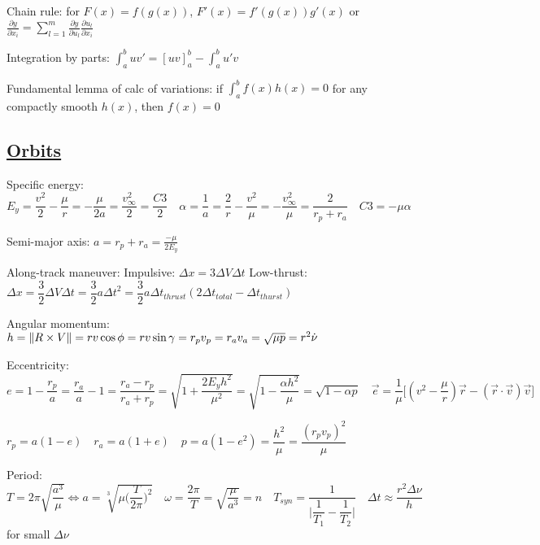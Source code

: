 \documentclass[11pt,landscape]{article}
\begin{document}
Chain rule: for $F(x)=f(g(x))$, $F'(x)=f'(g(x))g'(x)$
or $\frac{\partial y}{\partial x_i} = 
\sum_{l=1}^{m} \frac{\partial y}{\partial u_l}\frac{\partial u_l}{\partial x_i}$

Integration by parts: $\int_{a}^{b} u v' = [uv]_{a}^{b} - \int_{a}^{b} u'v$

Fundamental lemma of calc of variations:
if $\int_{a}^{b}f(x)h(x) = 0$ for any compactly smooth $h(x)$, then $f(x)=0$




\newpage
\subsection{\underline{Orbits}}

\begin{wrapfigure}{r}{0.25\textwidth}
\end{wrapfigure}

Specific energy:
$
E_y 
= \dfrac{v^2}{2} - \dfrac{\mu}{r} 
= -\dfrac{\mu}{2a} 
= \dfrac{v_{\infty}^2}{2} 
= \dfrac{C3}{2}
\quad
\alpha
= \dfrac{1}{a}
= \dfrac{2}{r} - \dfrac{v^2}{\mu}
= -\dfrac{v_{\infty}^2}{\mu}
= \dfrac{2}{r_p+r_a}
\quad
C3 = -\mu\alpha
$

Semi-major axis:
$
a
= r_p + r_a
= \frac{-\mu}{2 E_y}
$


Along-track maneuver:
\quad
Impulsive:
$\Delta x = 3 \Delta V \Delta t$
\quad
Low-thrust:
$
\Delta x 
= \dfrac{3}{2} \Delta V \Delta t 
= \dfrac{3}{2} a {\Delta t}^2
= \dfrac{3}{2} a \Delta t_{thrust} ( 2\Delta t_{total} - \Delta t_{thurst} )
$

Angular momentum:
$
h
=\left\lVert R \times V \right\rVert
=rv \cos \phi
=rv \sin \gamma
=r_p v_p
=r_a v_a
=\sqrt{\mu p}
=r^2 \dot{\nu}
$

Eccentricity:
$
e 
=1-\dfrac{r_p}{a}
=\dfrac{r_a}{a}-1
=\dfrac{r_a-r_p}{r_a+r_p}
=\sqrt{1+\dfrac{2 E_y h^2}{\mu^2}}
=\sqrt{1-\dfrac{\alpha h^2}{\mu}}
=\sqrt{1-\alpha p}
\quad
\vec{e} = \dfrac{1}{\mu} 
\big[ (v^2-\dfrac{\mu}{r})\vec{r} - (\vec{r} \cdot \vec{v})\vec{v} \big]
$

$
r_p = a(1-e)
\quad
r_a = a(1+e)
\quad
p 
= a(1-e^2)
= \dfrac{h^2}{\mu}
= \dfrac{(r_p v_p)^2}{\mu}
$

Period:
$
T=2\pi\sqrt{\dfrac{a^3}{\mu}}
\Leftrightarrow
a = \sqrt[3]{\mu \big( \dfrac{T}{2\pi} \big)^2} 
\quad
\omega 
= \dfrac{2\pi}{T}
= \sqrt{\dfrac{\mu}{a^3}}
= n
\quad
T_{syn}=\dfrac{1}{\big| \dfrac{1}{T_1} - \dfrac{1}{T_2} \big|}
\quad
\Delta t \approx \dfrac{r^2 \Delta\nu}{h}$ for small $\Delta\nu$
\end{document}
